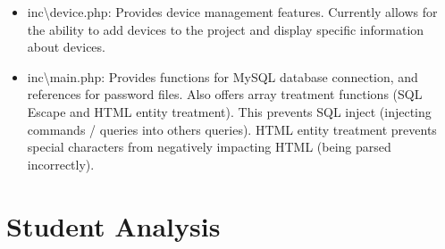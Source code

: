 \documentclass{article}
\begin{document}
\begin{itemize}
					\item inc\textbackslash device.php: Provides device management features. Currently allows for the ability to add devices to the project
														and display specific information about devices.
					
					\item inc\textbackslash main.php: Provides functions for MySQL database connection, and references for password files. 
													  Also offers array treatment functions (SQL Escape and HTML entity treatment). This prevents
													  SQL inject (injecting commands / queries into others queries). HTML entity treatment prevents special 
													  characters from negatively impacting HTML (being parsed incorrectly).	
				\end{itemize}						
		
	\newpage
	\section{Student Analysis}\label{sec:analysis}
\end{document}
